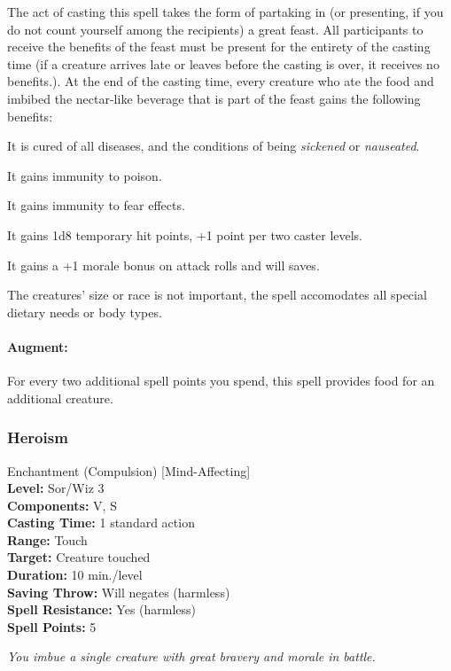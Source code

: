 The act of casting this spell takes the form of partaking in (or presenting, if you do not count yourself among the recipients) a great feast. 
All participants to receive the benefits of the feast must be present for the entirety of the casting time (if a creature arrives late or leaves before the casting is over, it receives no benefits.).
At the end of the casting time, every creature who ate the food and imbibed the nectar-like beverage that is part of the feast gains the following benefits:
\begin{list}{}{\leftmargin=1em}
 \item It is cured of all diseases, and the conditions of being \emph{sickened} or \emph{nauseated}.
 \item It gains immunity to poison.
 \item It gains immunity to fear effects.
 \item It gains 1d8 temporary hit points, +1 point per two caster levels.
 \item It gains a +1 morale bonus on attack rolls and will saves.
\end{list}
The creatures' size or race is not important, the spell accomodates all special dietary needs or body types.

\paragraph{Augment:} For every two additional spell points you spend, this spell provides food for an additional creature.
\subsubsection{Heroism}
\label{Spell:Heroism}
Enchantment (Compulsion) [Mind-Affecting]
\\ \textbf{Level:} Sor/Wiz 3
\\ \textbf{Components:} V, S
\\ \textbf{Casting Time:} 1 standard action
\\ \textbf{Range:} Touch
\\ \textbf{Target:} Creature touched
\\ \textbf{Duration:} 10 min./level
\\ \textbf{Saving Throw:} Will negates (harmless)
\\ \textbf{Spell Resistance:} Yes (harmless)
\\ \textbf{Spell Points:} 5

\emph{You imbue a single creature with great bravery and morale in battle.} 

